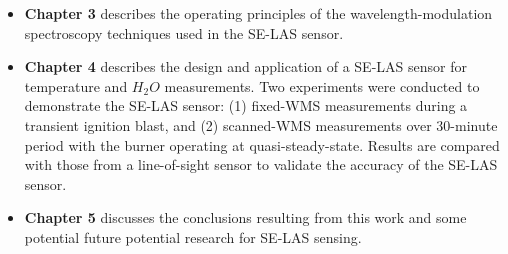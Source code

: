\begin{itemize}
\item \textbf{Chapter 3} describes the operating principles of the wavelength-modulation spectroscopy techniques used in the SE-LAS sensor.
\end{itemize}

\begin{itemize}
\item \textbf{Chapter 4} describes the design and application of a SE-LAS sensor for temperature and $H_2O$ measurements. Two experiments were conducted to demonstrate the SE-LAS sensor: (1) fixed-WMS measurements during a transient ignition blast, and (2) scanned-WMS measurements over 30-minute period with the burner operating at quasi-steady-state. Results are compared with those from a line-of-sight sensor to validate the accuracy of the SE-LAS sensor.
\end{itemize}


\begin{itemize}
\item \textbf{Chapter 5} discusses the conclusions resulting from this work and some potential future potential research for SE-LAS sensing.
\end{itemize}
